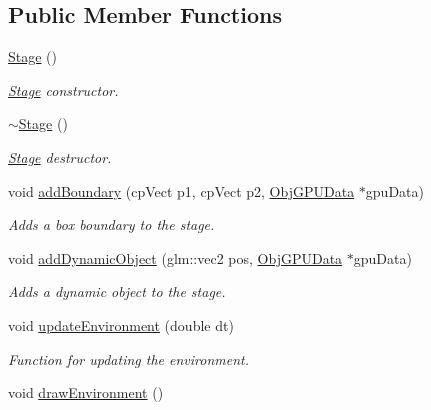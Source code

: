 \subsection*{Public Member Functions}
\begin{DoxyCompactItemize}
\item 
\hyperlink{class_stage_a81f5f991cdf4e5b78cb06cdfa805cc5e}{Stage} ()\hypertarget{class_stage_a81f5f991cdf4e5b78cb06cdfa805cc5e}{}\label{class_stage_a81f5f991cdf4e5b78cb06cdfa805cc5e}

\begin{DoxyCompactList}\small\item\em \hyperlink{class_stage}{Stage} constructor. \end{DoxyCompactList}\item 
\hyperlink{class_stage_af769a51df1efaaa5fca98008fb6f0c16}{$\sim$\+Stage} ()\hypertarget{class_stage_af769a51df1efaaa5fca98008fb6f0c16}{}\label{class_stage_af769a51df1efaaa5fca98008fb6f0c16}

\begin{DoxyCompactList}\small\item\em \hyperlink{class_stage}{Stage} destructor. \end{DoxyCompactList}\item 
void \hyperlink{class_stage_a507a2f44e152fb7ab10b4d802c1c3ae9}{add\+Boundary} (cp\+Vect p1, cp\+Vect p2, \hyperlink{class_obj_g_p_u_data}{Obj\+G\+P\+U\+Data} $\ast$gpu\+Data)
\begin{DoxyCompactList}\small\item\em Adds a box boundary to the stage. \end{DoxyCompactList}\item 
void \hyperlink{class_stage_ac77ecdea6812f2dced96494ac7f32e4a}{add\+Dynamic\+Object} (glm\+::vec2 pos, \hyperlink{class_obj_g_p_u_data}{Obj\+G\+P\+U\+Data} $\ast$gpu\+Data)
\begin{DoxyCompactList}\small\item\em Adds a dynamic object to the stage. \end{DoxyCompactList}\item 
void \hyperlink{class_stage_a3b0abe7d74c6d38cfedeab84a7506816}{update\+Environment} (double dt)
\begin{DoxyCompactList}\small\item\em Function for updating the environment. \end{DoxyCompactList}\item 
void \hyperlink{class_stage_a550f7504d9f1eb45a1f0a24c29b58fc8}{draw\+Environment} ()\hypertarget{class_stage_a550f7504d9f1eb45a1f0a24c29b58fc8}{}\label{class_stage_a550f7504d9f1eb45a1f0a24c29b58fc8}


\end{DoxyCompactItemize}

